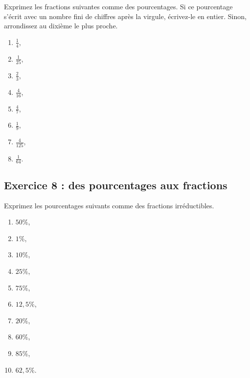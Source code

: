 \documentclass[14 pt]{extarticle}
\theoremstyle{plain}
\begin{document}
Exprimez les fractions suivantes comme des pourcentages. Si ce pourcentage s'écrit avec un nombre fini de chiffres après la virgule, écrivez-le en entier. Sinon, arrondissez au dixième le plus proche. 

\begin{enumerate}
\item $\frac14$,
\item $\frac1{25}$,
\item $\frac23$,
\item $\frac{4}{16}$,
\item $ \frac47$,
\item $\frac19$,
\item $\frac4{125}$,
\item $\frac1{64}$.
\end{enumerate}


\subsection*{Exercice 8 : des pourcentages aux fractions}

Exprimez les pourcentages suivants comme des fractions irréductibles.

\begin{enumerate}
\item $50\%$,
\item $1\%$,
\item $10\%$,
\item $25\%$,
\item $75\%$,
\item $12,5\%$,
\item $20\%$, 
\item $60\%$, 
\item $85\%$, 
\item $62,5\%$.
\end{enumerate}

 	
\end{document}
